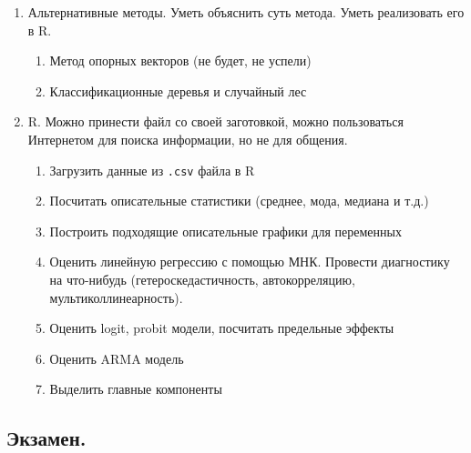 \documentclass[12pt, a4paper]{article}
\begin{document}
\begin{enumerate}
\item Альтернативные методы. Уметь объяснить суть метода. Уметь реализовать его в R. %
\begin{enumerate}
\item Метод опорных векторов (не будет, не успели)
\item Классификационные деревья и случайный лес
\end{enumerate}


\item R. Можно принести файл со своей заготовкой, можно пользоваться Интернетом для поиска информации, но не для общения.
\begin{enumerate}
\item Загрузить данные из \verb|.csv| файла в R
\item Посчитать описательные статистики (среднее, мода, медиана и т.д.)
\item Построить подходящие описательные графики для переменных
\item Оценить линейную регрессию с помощью МНК. Провести диагностику на что-нибудь (гетероскедастичность, автокорреляцию, мультиколлинеарность).
\item Оценить logit, probit модели, посчитать предельные эффекты
\item Оценить ARMA модель
\item Выделить главные компоненты
\end{enumerate}


\end{enumerate}



\subsection{Экзамен.}
\end{document}
